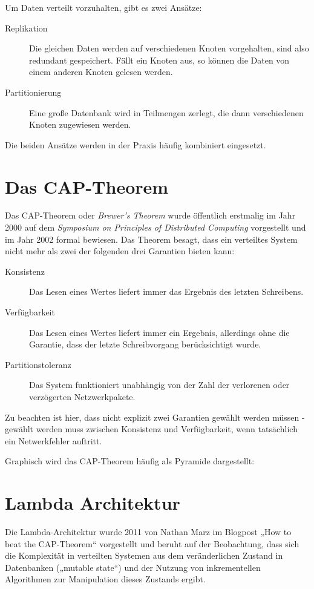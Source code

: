 \documentclass[a4paper,11pt]{scrartcl}
\begin{document}
Um Daten verteilt vorzuhalten, gibt es zwei Ansätze:

\begin{description}
  \item[Replikation] Die gleichen Daten werden auf verschiedenen Knoten
    vorgehalten, sind also redundant gespeichert. Fällt ein Knoten aus, so
    können die Daten von einem anderen Knoten gelesen werden.
  \item[Partitionierung] Eine große Datenbank wird in Teilmengen zerlegt, die
    dann verschiedenen Knoten zugewiesen werden.
\end{description}

Die beiden Ansätze werden in der Praxis häufig kombiniert eingesetzt.

\section{Das CAP-Theorem}
Das CAP-Theorem oder \textit{Brewer's Theorem} wurde öffentlich erstmalig im
Jahr 2000 auf dem \textit{Symposium on Principles of Distributed Computing}
vorgestellt und im Jahr 2002 formal bewiesen. Das Theorem besagt, dass ein
verteiltes System nicht mehr als zwei der folgenden drei Garantien bieten kann:

\begin{description}
  \item[Konsistenz] Das Lesen eines Wertes liefert immer das Ergebnis des
    letzten Schreibens.
  \item[Verfügbarkeit] Das Lesen eines Wertes liefert immer ein Ergebnis,
    allerdings ohne die Garantie, dass der letzte Schreibvorgang berücksichtigt
    wurde.
  \item[Partitionstoleranz] Das System funktioniert unabhängig von der Zahl der
    verlorenen oder verzögerten Netzwerkpakete.
\end{description}

Zu beachten ist hier, dass nicht explizit zwei Garantien gewählt werden müssen
- gewählt werden muss zwischen Konsistenz und Verfügbarkeit, wenn tatsächlich
ein Netwerkfehler auftritt.

Graphisch wird das CAP-Theorem häufig als Pyramide dargestellt:


\section{Lambda Architektur}
Die Lambda-Architektur wurde 2011 von Nathan Marz im Blogpost „How to beat the
CAP-Theorem“ vorgestellt und beruht auf der Beobachtung, dass sich die
Komplexität in verteilten Systemen aus dem veränderlichen Zustand in
Datenbanken („mutable state“) und der Nutzung von inkrementellen Algorithmen
zur Manipulation dieses Zustands ergibt.
\end{document}
